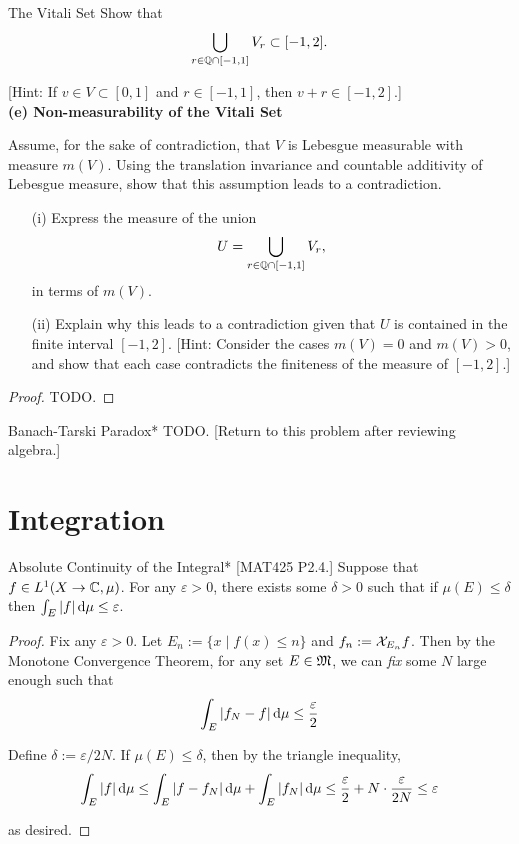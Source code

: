 \begin{problem}{The Vitali Set}
    Show that
    \[
    \bigcup_{r \in \mathbb{Q} \cap [-1,1]} V_r \subset [-1,2].
    \]

    [Hint: If \(v \in V \subset [0,1]\) and \(r \in [-1,1]\), then \(v + r \in [-1,2]\).] \\

    \stdvspace
    \textbf{(e) Non-measurability of the Vitali Set}
    \stdvspace

    Assume, for the sake of contradiction, that \(V\) is Lebesgue measurable with measure \(m(V)\). Using the translation invariance and countable additivity of Lebesgue measure, show that this assumption leads to a contradiction.

    \begin{itemize}
    \item[(i)] Express the measure of the union
    \[
        U = \bigcup_{r \in \mathbb{Q} \cap [-1,1]} V_r,
    \]
    in terms of \(m(V)\).

    \item[(ii)] Explain why this leads to a contradiction given that \(U\) is contained in the finite interval \([-1,2]\). [Hint: Consider the cases \(m(V) = 0\) and \(m(V) > 0\), and show that each case contradicts the finiteness of the measure of \([-1,2]\).]
    \end{itemize}
\end{problem}

\begin{proof}
    TODO. 
\end{proof}

\begin{problem}{Banach-Tarski Paradox}*
    TODO. [Return to this problem after reviewing algebra.]
\end{problem}

\newpage
\section{Integration}

\begin{problem}{Absolute Continuity of the Integral}*
    [MAT425 P2.4.] Suppose that \(f \in L^1(X \to \mathbb{C}, \mu)\). For any \(\varepsilon > 0\), there exists some \(\delta > 0\) such that if \(\mu(E) \leq \delta\) then \(\int_E |f| \, \mathrm{d}\mu \leq \varepsilon\). 
\end{problem}

\begin{proof}
    Fix any \(\varepsilon > 0\). Let \(E_n := \{x \mid f(x) \leq n\}\) and \(f_n := \mathcal{X}_{E_n}f\). Then by the Monotone Convergence Theorem, for any set \(E \in \mathfrak{M}\), we can \textit{fix} some \(N\) large enough such that
    \[
    \int_E |f_N - f| \, \mathrm{d}\mu \leq \frac{\varepsilon}{2}
    \]

    Define \(\delta := \varepsilon / 2N\). If \(\mu(E) \leq \delta\), then by the triangle inequality, 
    \[
    \int_E |f| \, \mathrm{d}\mu 
    \leq \int_E |f - f_N| \, \mathrm{d}\mu + \int_E |f_N| \, \mathrm{d}\mu
    \leq \frac{\varepsilon}{2} + N \cdot \frac{\varepsilon}{2N}
    \leq \varepsilon
    \]

    as desired. 
\end{proof}

